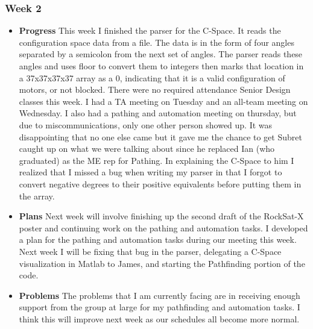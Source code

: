 \subsubsection{Week 2}
\begin{itemize}
\item{
\textbf{Progress}
This week I finished the parser for the C-Space. It reads the configuration space data from a file. The data is in the form of four angles separated by a semicolon from the next set of angles. The parser reads these angles and uses floor to convert them to integers then marks that location in a 37x37x37x37 array as a 0, indicating that it is a valid configuration of motors, or not blocked. There were no required attendance Senior Design classes this week. I had a TA meeting on Tuesday and an all-team meeting on Wednesday. I also had a pathing and automation meeting on thursday, but due to miscommunications, only one other person showed up. It was disappointing that no one else came but it gave me the chance to get Subret caught up on what we were talking about since he replaced Ian (who graduated) as the ME rep for Pathing. In explaining the C-Space to him I realized that I missed a bug when writing my parser in that I forgot to convert negative degrees to their positive equivalents before putting them in the array.
}
\item{
\textbf{Plans}
Next week will involve finishing up the second draft of the RockSat-X poster and continuing work on the pathing and automation tasks. I developed a plan for the pathing and automation tasks during our meeting this week. Next week I will be fixing that bug in the parser, delegating a C-Space visualization in Matlab to James, and starting the Pathfinding portion of the code.
}
\item{
\textbf{Problems}
The problems that I am currently facing are in receiving enough support from the group at large for my pathfinding and automation tasks. I think this will improve next week as our schedules all become more normal.
}
\end{itemize}

